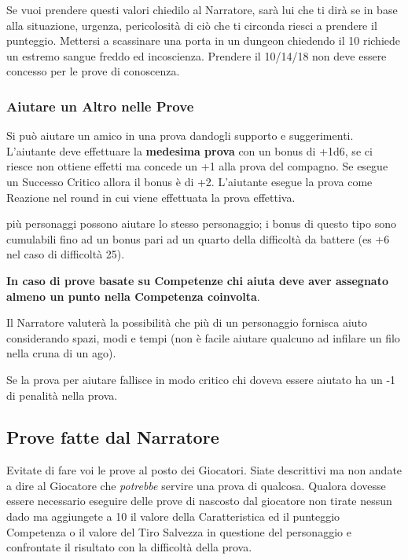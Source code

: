 \begin{multicols}{2}
Se vuoi prendere questi valori chiedilo al Narratore, sarà lui che ti dirà se in base alla situazione, urgenza, pericolosità di ciò che ti circonda riesci a prendere il punteggio. Mettersi a scassinare una porta in un dungeon chiedendo il 10 richiede un estremo sangue freddo ed incoscienza. Prendere il 10/14/18 non deve essere concesso per le prove di conoscenza.

\subsubsection{Aiutare un Altro nelle Prove}\label{aiutarealtro}

Si può aiutare un amico in una prova dandogli supporto e suggerimenti. L'aiutante deve effettuare la \textbf{medesima prova} con un bonus di +1d6, se ci riesce non ottiene effetti ma concede un +1 alla prova del compagno. Se esegue un Successo Critico allora il bonus è di +2. L'aiutante esegue la prova come Reazione nel round in cui viene effettuata la prova effettiva.

più personaggi possono aiutare lo stesso personaggio; i bonus di questo tipo sono cumulabili fino ad un bonus pari ad un quarto della difficoltà da battere (es +6 nel caso di difficoltà 25).

\textbf{In caso di prove basate su Competenze chi aiuta deve aver assegnato almeno un punto nella Competenza coinvolta}.

Il Narratore valuterà la possibilità che più di un personaggio fornisca aiuto considerando spazi, modi e tempi (non è facile aiutare qualcuno ad infilare un filo nella cruna di un ago).

Se la prova per aiutare fallisce in modo critico chi doveva essere aiutato ha un -1 di penalità nella prova.

\subsection{Prove fatte dal Narratore}\label{provefattedalnarratore}

Evitate di fare voi le prove al posto dei Giocatori. Siate descrittivi ma non andate a dire al Giocatore che \emph{potrebbe} servire una prova di qualcosa. Qualora dovesse essere necessario eseguire delle prove di nascosto dal giocatore non tirate nessun dado ma aggiungete a 10 il valore della Caratteristica ed il punteggio Competenza o il valore del Tiro Salvezza in questione del personaggio e confrontate il risultato con la difficoltà della prova.


\end{multicols}
